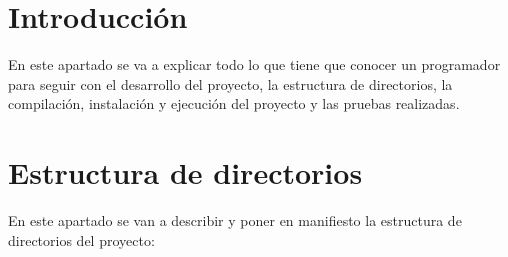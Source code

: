 
\section{Introducción}

En este apartado se va a explicar todo lo que tiene que conocer un programador para seguir con el desarrollo del proyecto, la estructura de directorios, la compilación, instalación y ejecución del proyecto y las pruebas realizadas.

\section{Estructura de directorios}

En este apartado se van a describir y poner en manifiesto la estructura de directorios del proyecto:


